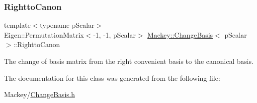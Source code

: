 \subsubsection{\texorpdfstring{Rightto\+Canon}{RighttoCanon}}
{\footnotesize\ttfamily template$<$typename p\+Scalar$>$ \\
Eigen\+::\+Permutation\+Matrix$<$-\/1, -\/1, p\+Scalar$>$ \hyperlink{classMackey_1_1ChangeBasis}{Mackey\+::\+Change\+Basis}$<$ p\+Scalar $>$\+::Rightto\+Canon}



The change of basis matrix from the right convenient basis to the canonical basis. 



The documentation for this class was generated from the following file\+:\begin{DoxyCompactItemize}
\item 
Mackey/\hyperlink{ChangeBasis_8h}{Change\+Basis.\+h}\end{DoxyCompactItemize}

